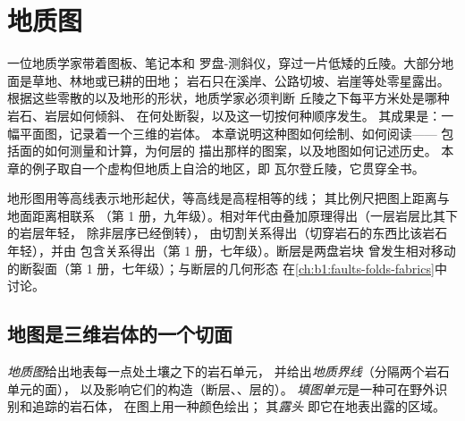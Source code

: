 \chapter{地质图}\label{ch:b1:geological-maps}

一位地质学家带着图板、笔记本和
罗盘-测斜仪，穿过一片低矮的丘陵。大部分地面是草地、林地或已耕的田地；
岩石只在溪岸、公路切坡、岩崖等处零星露出。
根据这些零散的以及地形的形状，地质学家必须判断
丘陵之下每平方米处是哪种岩石、岩层如何倾斜、
在何处断裂，以及这一切按何种顺序发生。
其成果是：一幅平面图，记录着一个三维的岩体。
本章说明这种图如何绘制、如何阅读——
包括面的如何测量和计算，为何层的
描出那样的图案，以及地图如何记述历史。
本章的例子取自一个虚构但地质上自洽的地区，即
瓦尔登丘陵，它贯穿全书。

\begin{recall}
地形图用等高线表示地形起伏，等高线是高程相等的线；
其比例尺把图上距离与地面距离相联系
（第 1 册，九年级）。相对年代由叠加原理得出（一层岩层比其下的岩层年轻，
除非层序已经倒转），
由切割关系得出（切穿岩石的东西比该岩石年轻），并由
包含关系得出（第 1 册，七年级）。断层是两盘岩块
曾发生相对移动的断裂面（第 1 册，七年级）；与断层的几何形态
在\cref{ch:b1:faults-folds-fabrics}中讨论。
\end{recall}

\section{地图是三维岩体的一个切面}\label{sec:b1:geological-maps:cut}

\begin{definition}[地质图]\label{def:b1:geological-maps:geological-map}
\emph{地质图}给出地表每一点处土壤之下的岩石单元，
并给出\emph{地质界线}（分隔两个岩石单元的面），
以及影响它们的构造（断层、、层的）。
\emph{填图单元}是一种可在野外识别和追踪的岩石体，
在图上用一种颜色绘出；
其\emph{露头}
即它在地表出露的区域。
\end{definition}

